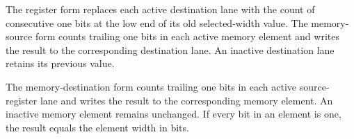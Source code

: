 The register form replaces each active destination lane with the count of
consecutive one bits at the low end of its old selected-width value. The
memory-source form counts trailing one bits in each active memory element and
writes the result to the corresponding destination lane. An inactive destination
lane retains its previous value.

The memory-destination form counts trailing one bits in each active
source-register lane and writes the result to the corresponding memory element.
An inactive memory element remains unchanged. If every bit in an element is one,
the result equals the element width in bits.
